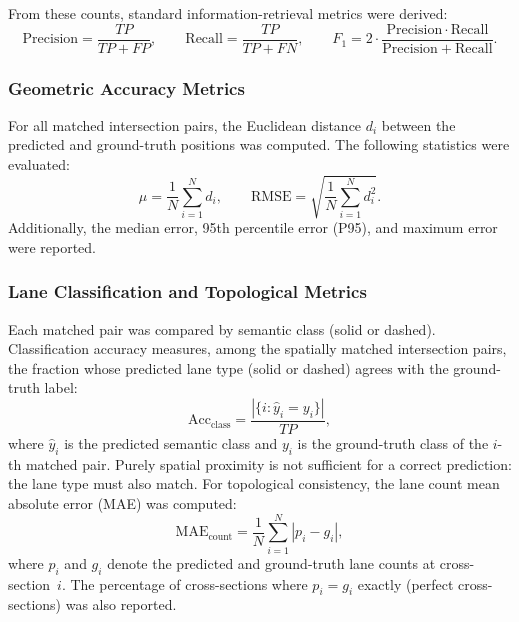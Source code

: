 From these counts, standard information-retrieval metrics were derived:
\begin{equation}
  \mathrm{Precision} = \frac{TP}{TP + FP}, \qquad
  \mathrm{Recall} = \frac{TP}{TP + FN}, \qquad
  F_1 = 2 \cdot \frac{\mathrm{Precision} \cdot \mathrm{Recall}}{\mathrm{Precision} + \mathrm{Recall}}.
  \label{eq:prf1}
\end{equation}

\subsubsection{Geometric Accuracy Metrics}

For all matched intersection pairs, the Euclidean distance $d_i$ between the predicted and ground-truth positions was computed. The following statistics were evaluated:
\begin{equation}
  \mu = \frac{1}{N}\sum_{i=1}^{N} d_i, \qquad
  \mathrm{RMSE} = \sqrt{\frac{1}{N}\sum_{i=1}^{N} d_i^2}.
  \label{eq:lane_geo}
\end{equation}
Additionally, the median error, 95th percentile error (P95), and maximum error were reported.

\subsubsection{Lane Classification and Topological Metrics}

Each matched pair was compared by semantic class (solid or dashed). Classification accuracy measures, among the spatially matched intersection pairs, the fraction whose predicted lane type (solid or dashed) agrees with the ground-truth label:
\begin{equation}
  \mathrm{Acc}_{\mathrm{class}} = \frac{|\{i : \hat{y}_i = y_i\}|}{TP},
  \label{eq:class_acc}
\end{equation}
where $\hat{y}_i$ is the predicted semantic class and $y_i$ is the ground-truth class of the $i$-th matched pair. Purely spatial proximity is not sufficient for a correct prediction: the lane type must also match. For topological consistency, the lane count mean absolute error (MAE) was computed:
\begin{equation}
  \mathrm{MAE}_{\mathrm{count}} = \frac{1}{N}\sum_{i=1}^{N} |p_i - g_i|,
  \label{eq:lane_count_mae}
\end{equation}
where $p_i$ and $g_i$ denote the predicted and ground-truth lane counts at cross-section~$i$. The percentage of cross-sections where $p_i = g_i$ exactly (perfect cross-sections) was also reported.

